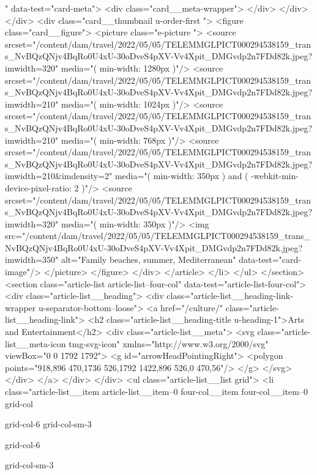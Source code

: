 {{{						
						" data-test="card-meta">
<div class="card__meta-wrapper">
</div>
</div>
</div>
<div class="card__thumbnail u-order-first ">
<figure class="card__figure">
<picture class="e-picture   ">
<source srcset="/content/dam/travel/2022/05/05/TELEMMGLPICT000294538159_trans_NvBQzQNjv4BqRo0U4xU-30oDveS4pXV-Vv4Xpit_DMGvdp2n7FDd82k.jpeg?imwidth=320" media="( min-width: 1280px )"/>
<source srcset="/content/dam/travel/2022/05/05/TELEMMGLPICT000294538159_trans_NvBQzQNjv4BqRo0U4xU-30oDveS4pXV-Vv4Xpit_DMGvdp2n7FDd82k.jpeg?imwidth=210" media="( min-width: 1024px )"/>
<source srcset="/content/dam/travel/2022/05/05/TELEMMGLPICT000294538159_trans_NvBQzQNjv4BqRo0U4xU-30oDveS4pXV-Vv4Xpit_DMGvdp2n7FDd82k.jpeg?imwidth=210" media="( min-width: 768px )"/>
<source srcset="/content/dam/travel/2022/05/05/TELEMMGLPICT000294538159_trans_NvBQzQNjv4BqRo0U4xU-30oDveS4pXV-Vv4Xpit_DMGvdp2n7FDd82k.jpeg?imwidth=210&imdensity=2" media="( min-width: 350px ) and ( -webkit-min-device-pixel-ratio: 2 )"/>
<source srcset="/content/dam/travel/2022/05/05/TELEMMGLPICT000294538159_trans_NvBQzQNjv4BqRo0U4xU-30oDveS4pXV-Vv4Xpit_DMGvdp2n7FDd82k.jpeg?imwidth=320" media="( min-width: 350px )"/>
<img src="/content/dam/travel/2022/05/05/TELEMMGLPICT000294538159_trans_NvBQzQNjv4BqRo0U4xU-30oDveS4pXV-Vv4Xpit_DMGvdp2n7FDd82k.jpeg?imwidth=350" alt="Family beaches, summer, Mediterranean" data-test="card-image"/>
</picture>
</figure>
</div>
</article>
</li>
</ul>
</section>
<section class="article-list article-list--four-col" data-test="article-list-four-col">
<div class="article-list__heading">
<div class="article-list__heading-link-wrapper
				u-separator-bottom--loose">
<a href="/culture/" class="article-list__heading-link">
<h2 class="article-list__heading-title u-heading-1">Arts and Entertainment</h2>
<div class="article-list__meta">
<svg class="article-list__meta-icon  tmg-svg-icon" xmlns="http://www.w3.org/2000/svg" viewBox="0 0 1792 1792">
<g id="arrowHeadPointingRight">
<polygon points="918,896 470,1736 526,1792 1422,896 526,0 470,56"/>
</g>
</svg>
</div>
</a>
</div>
</div>
<ul class="article-list__list grid">
<li class="article-list__item article-list__item--0 four-col__item four-col__item--0
			grid-col
			
			
			grid-col-6 grid-col-sm-3
			
			grid-col-6
			
			
			
			
			
			grid-col-sm-3
			
			
			
			
			
}}}
